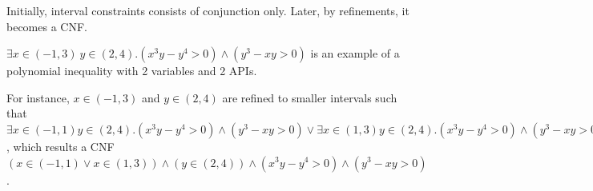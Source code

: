\documentclass[runningheads,a4paper,oribibl]{llncs}
\newcommand{\Real}{{\mathbb R}}
\newcommand{\Rat}{{\mathbb Q}}
\newcommand{\suppress}[1]{} %
\newcommand{\mizuhito}[1]{\{{\bf Mizuhito:~\sf #1}\}} %
\begin{document}
\suppress{
\begin{lemma} \label{cor:rattoreal}
For a polynomial inequality
$F = \exists x_1 \in I_1 \cdots x_n \in I_n. \bigwedge \limits_{j=1}^m f_j > 0$, 
If there exists an SAT instance of F in $\Real^n$, there exists also in $\Rat^n$. 
\end{lemma}

\begin{lemma} \label{cor:refinement}
Suppose that $a_j < b_j$ for $1 \leq j \leq n$ and $f_i$'s are polynomials. 
Assume $a_k < c < b_k$ for some $k$. 
Then, 
$\exists x_1 \in (a_1,b_1) \cdots x_n \in (a_n,b_n). \bigwedge \limits_{i=1}^m f_i > 0$ 
is SAT (resp. UNSAT) if, and only if, 
$\exists x_1 \in (a_1,b_1) \cdots x_k \in (a_k,c) \cdots x_n \in (a_n,b_n). 
 \bigwedge \limits_{i=1}^m f_i > 0 
 \vee 
 \exists x_1 \in (a_1,b_1) \cdots x_k \in (c,b_k) \cdots x_n \in (a_n,b_n)). 
 \bigwedge \limits_{i=1}^m f_i > 0$ 
is SAT (resp. UNSAT). 
\end{lemma}

\begin{pf}
We show for the SAT case. If-part is obvious. For only-if-part, 
since $\mathbb{S}(\bigwedge \limits_{i=1}^m f_i > 0)$ is an open set, 
if $y \in (a_1,b_1) \times \cdots \{c\} \cdots \times (a_n,b_n)$ satisfies 
$\bigwedge \limits_{i=1}^m f_i > 0$, 
there exists $x_1 \in (a_1,b_1) \cdots x_k \in (a_k,c) \cdots x_n \in (a_n,b_n)$
(also $x_1 \in (a_1,b_1) \cdots x_k \in (c,b_k) \cdots x_n \in (a_n,b_n)$) that satisfies
$\bigwedge \limits_{i=1}^m f_i > 0$. 
\end{pf}

Lemma~\ref{cor:rattoreal} says that proving SAT of $F$ in $\Real$ is reduced to 
that in $\Rat$. 
Lemma~\ref{cor:refinement} says that, in the refinement step, we can apply refinement 
$x_k \in (a_k,b_k)$ to $x_k \in (a_k,c) \vee x_k \in (c,b_k)$, 
instead of $x_k \in (a_k,c] \vee x_k \in (c,b_k) $
(i.e., $c$ is ignored). 
}

Initially, interval constraints consists of conjunction only. Later, by refinements, it becomes a CNF. 


\begin{example} \label{examp:poly_ieq}
$\exists x \in (-1,3)~y \in (2,4) . (x^3y - y^4 > 0) \wedge (y^3 -xy >0)$
is an example of a polynomial inequality with 2 variables and 2 APIs. 

For instance, $x \in (-1,3)$ and $y \in (2,4)$ are refined to smaller intervals
such that 
$\exists x \in (-1,1) y \in (2,4) . (x^3y - y^4 > 0) \wedge (y^3 -xy >0) \vee 
 \exists x \in (1,3) y \in (2,4) . (x^3y - y^4 > 0) \wedge (y^3 -xy >0)$, 
which results a CNF 
$(x \in (-1,1) \vee x \in (1,3)) \wedge (y \in (2,4)) \wedge (x^3y - y^4 > 0) \wedge (y^3 -xy >0)$.
\end{example}
\end{document}
